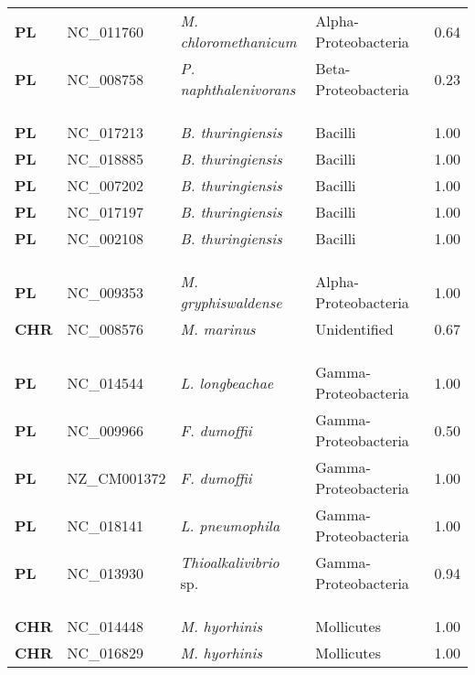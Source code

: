 \begin{adjustwidth}{-3cm}{2cm}
{\begin{supertabular}{>{\bfseries}l|p{0.1\textwidth}p{0.14\textwidth}l|l}
PL & NC\_011760 & \textit{M. chloromethanicum} & Alpha-Proteobacteria & 0.64\\
PL & NC\_008758 & \textit{P. naphthalenivorans} & Beta-Proteobacteria & 0.23\\
\\
\\
\hline\\
PL & NC\_017213 & \textit{B. thuringiensis} & Bacilli & 1.00\\
PL & NC\_018885 & \textit{B. thuringiensis} & Bacilli & 1.00\\
PL & NC\_007202 & \textit{B. thuringiensis} & Bacilli & 1.00\\
PL & NC\_017197 & \textit{B. thuringiensis} & Bacilli & 1.00\\
PL & NC\_002108 & \textit{B. thuringiensis} & Bacilli & 1.00\\
\\
\\
\hline\\
PL & NC\_009353 & \textit{M. gryphiswaldense} & Alpha-Proteobacteria & 1.00\\
CHR & NC\_008576 & \textit{M. marinus} & Unidentified & 0.67\\
\\
\\
\hline\\
PL & NC\_014544 & \textit{L. longbeachae} & Gamma-Proteobacteria & 1.00\\
PL & NC\_009966 & \textit{F. dumoffii} & Gamma-Proteobacteria & 0.50\\
PL & NZ\_CM001372 & \textit{F. dumoffii} & Gamma-Proteobacteria & 1.00\\
PL & NC\_018141 & \textit{L. pneumophila} & Gamma-Proteobacteria & 1.00\\
PL & NC\_013930 & \textit{Thioalkalivibrio} sp. & Gamma-Proteobacteria & 0.94\\
\\
\\
\hline\\
CHR & NC\_014448 & \textit{M. hyorhinis} & Mollicutes & 1.00\\
CHR & NC\_016829 & \textit{M. hyorhinis} & Mollicutes & 1.00\\

\end{supertabular}}
\end{adjustwidth}
